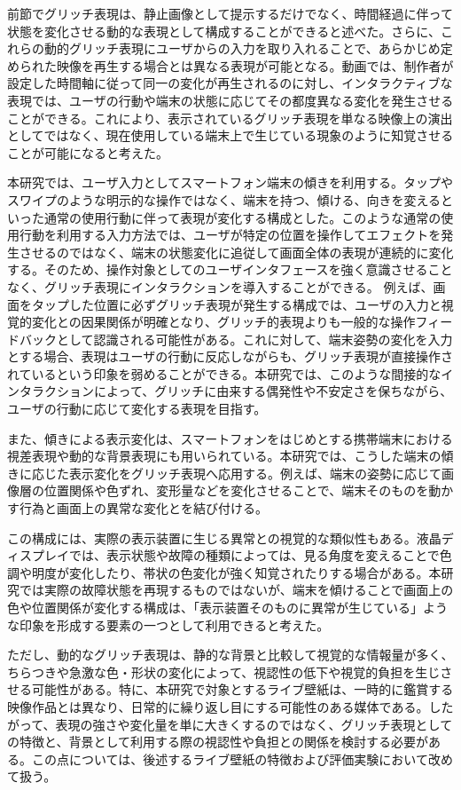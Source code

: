 前節でグリッチ表現は、静止画像として提示するだけでなく、時間経過に伴って状態を変化させる動的な表現として構成することができると述べた。さらに、これらの動的グリッチ表現にユーザからの入力を取り入れることで、あらかじめ定められた映像を再生する場合とは異なる表現が可能となる。動画では、制作者が設定した時間軸に従って同一の変化が再生されるのに対し、インタラクティブな表現では、ユーザの行動や端末の状態に応じてその都度異なる変化を発生させることができる。これにより、表示されているグリッチ表現を単なる映像上の演出としてではなく、現在使用している端末上で生じている現象のように知覚させることが可能になると考えた。

本研究では、ユーザ入力としてスマートフォン端末の傾きを利用する。タップやスワイプのような明示的な操作ではなく、端末を持つ、傾ける、向きを変えるといった通常の使用行動に伴って表現が変化する構成とした。このような通常の使用行動を利用する入力方法では、ユーザが特定の位置を操作してエフェクトを発生させるのではなく、端末の状態変化に追従して画面全体の表現が連続的に変化する。そのため、操作対象としてのユーザインタフェースを強く意識させることなく、グリッチ表現にインタラクションを導入することができる。
例えば、画面をタップした位置に必ずグリッチ表現が発生する構成では、ユーザの入力と視覚的変化との因果関係が明確となり、グリッチ的表現よりも一般的な操作フィードバックとして認識される可能性がある。これに対して、端末姿勢の変化を入力とする場合、表現はユーザの行動に反応しながらも、グリッチ表現が直接操作されているという印象を弱めることができる。本研究では、このような間接的なインタラクションによって、グリッチに由来する偶発性や不安定さを保ちながら、ユーザの行動に応じて変化する表現を目指す。

また、傾きによる表示変化は、スマートフォンをはじめとする携帯端末における視差表現や動的な背景表現にも用いられている。本研究では、こうした端末の傾きに応じた表示変化をグリッチ表現へ応用する。例えば、端末の姿勢に応じて画像層の位置関係や色ずれ、変形量などを変化させることで、端末そのものを動かす行為と画面上の異常な変化とを結び付ける。

この構成には、実際の表示装置に生じる異常との視覚的な類似性もある。液晶ディスプレイでは、表示状態や故障の種類によっては、見る角度を変えることで色調や明度が変化したり、帯状の色変化が強く知覚されたりする場合がある。本研究では実際の故障状態を再現するものではないが、端末を傾けることで画面上の色や位置関係が変化する構成は、「表示装置そのものに異常が生じている」ような印象を形成する要素の一つとして利用できると考えた。


ただし、動的なグリッチ表現は、静的な背景と比較して視覚的な情報量が多く、ちらつきや急激な色・形状の変化によって、視認性の低下や視覚的負担を生じさせる可能性がある。特に、本研究で対象とするライブ壁紙は、一時的に鑑賞する映像作品とは異なり、日常的に繰り返し目にする可能性のある媒体である。したがって、表現の強さや変化量を単に大きくするのではなく、グリッチ表現としての特徴と、背景として利用する際の視認性や負担との関係を検討する必要がある。この点については、後述するライブ壁紙の特徴および評価実験において改めて扱う。

